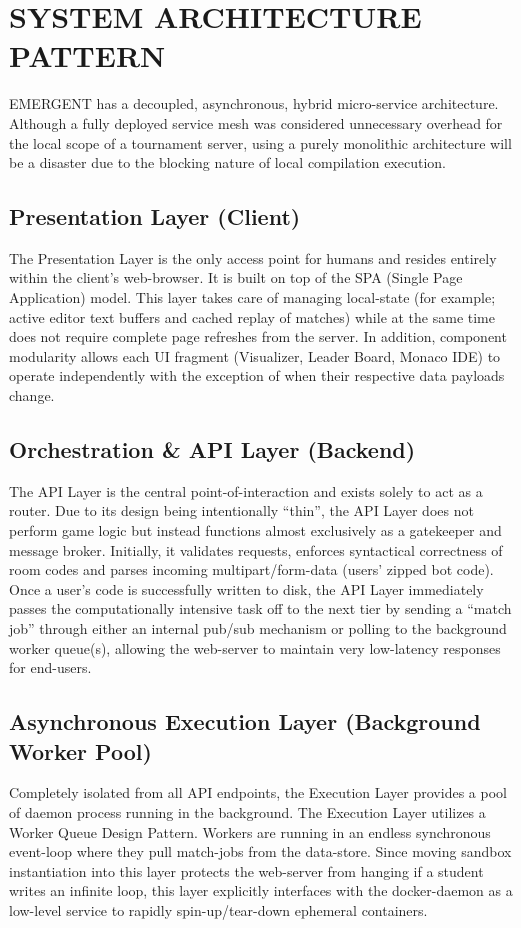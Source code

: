 \documentclass[12pt,a4paper]{report}
\begin{document}
\section{SYSTEM ARCHITECTURE PATTERN}
EMERGENT has a decoupled, asynchronous, hybrid micro-service architecture. Although a fully deployed service mesh was considered unnecessary overhead for the local scope of a tournament server, using a purely monolithic architecture will be a disaster due to the blocking nature of local compilation execution.

\subsection{Presentation Layer (Client)} 
The Presentation Layer is the only access point for humans and resides entirely within the client’s web-browser. It is built on top of the SPA (Single Page Application) model. This layer takes care of managing local-state (for example; active editor text buffers and cached replay of matches) while at the same time does not require complete page refreshes from the server. In addition, component modularity allows each UI fragment (Visualizer, Leader Board, Monaco IDE) to operate independently with the exception of when their respective data payloads change.

\subsection{Orchestration & API Layer (Backend)}
The API Layer is the central point-of-interaction and exists solely to act as a router. Due to its design being intentionally “thin”, the API Layer does not perform game logic but instead functions almost exclusively as a gatekeeper and message broker. Initially, it validates requests, enforces syntactical correctness of room codes and parses incoming multipart/form-data (users’ zipped bot code). Once a user’s code is successfully written to disk, the API Layer immediately passes the computationally intensive task off to the next tier by sending a “match job” through either an internal pub/sub mechanism or polling to the background worker queue(s), allowing the web-server to maintain very low-latency responses for end-users.

\subsection{Asynchronous Execution Layer (Background Worker Pool)}
Completely isolated from all API endpoints, the Execution Layer provides a pool of daemon process running in the background. The Execution Layer utilizes a Worker Queue Design Pattern. Workers are running in an endless synchronous event-loop where they pull match-jobs from the data-store. Since moving sandbox instantiation into this layer protects the web-server from hanging if a student writes an infinite loop, this layer explicitly interfaces with the docker-daemon as a low-level service to rapidly spin-up/tear-down ephemeral containers.
\end{document}
